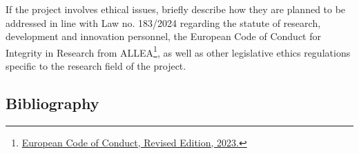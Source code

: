 \documentclass[draftproposal,pncdib]{pncdi-pd}
\begin{document}
\begin{pncdiexplanation}
If the project involves ethical issues, briefly describe how they are planned to be
addressed in line with Law no. 183/2024 regarding the statute of research, development
and innovation personnel, the European Code of Conduct for Integrity in Research from
ALLEA\footnote{\href{https://www.alleageneralassembly.org/wp-content/uploads/2023/06/European-Code-of-Conduct-Revised-Edition-2023.pdf}{European Code of Conduct, Revised Edition, 2023.}},
as well as other legislative ethics regulations specific to the research field of the project.
\end{pncdiexplanation}

\subsection{Bibliography}
\label{sc:project:bib}
\end{document}
